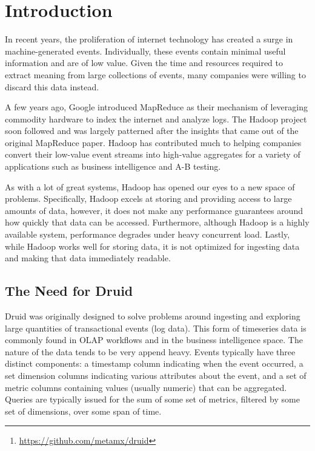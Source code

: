 \documentclass{vldb}
\begin{document}
\begin{abstract}
Druid is an open
source\footnote{\href{https://github.com/metamx/druid}{https://github.com/metamx/druid}}
data store built for exploratory analytics on large data sets.  Druid supports
fast data aggregation, low latency data ingestion, and arbitrary data
exploration. The system combines a column-oriented storage layout, a
distributed, shared-nothing architecture, and an advanced indexing structure to
return queries on billion-row tables with sub-second latencies.  Druid is
petabyte scale and is deployed in production at several technology companies.
\end{abstract}

\section{Introduction}
In recent years, the proliferation of internet technology has created a surge
in machine-generated events.  Individually, these events contain minimal useful
information and are of low value.  Given the time and resources required to
extract meaning from large collections of events, many companies were willing
to discard this data instead.  

A few years ago, Google introduced MapReduce as their mechanism of leveraging
commodity hardware to index the internet and analyze logs.  The Hadoop project
soon followed and was largely patterned after the insights that came out of the
original MapReduce paper. Hadoop has contributed much to helping companies
convert their low-value event streams into high-value aggregates for a variety
of applications such as business intelligence and A-B testing.

As with a lot of great systems, Hadoop has opened our eyes to a new space of
problems.  Specifically, Hadoop excels at storing and providing access to large
amounts of data, however, it does not make any performance guarantees around
how quickly that data can be accessed.  Furthermore, although Hadoop is a
highly available system, performance degrades under heavy concurrent load.
Lastly, while Hadoop works well for storing data, it is not optimized for
ingesting data and making that data immediately readable.

\subsection{The Need for Druid}
Druid was originally designed to solve problems around ingesting and exploring
large quantities of transactional events (log data). This form of timeseries
data is commonly found in OLAP workflows and in the business intelligence
space. The nature of the data tends to be very append heavy. Events typically
have three distinct components: a timestamp column indicating when the event
occurred, a set dimension columns indicating various attributes about the
event, and a set of metric columns containing values (usually numeric) that can
be aggregated. Queries are typically issued for the sum of some set of metrics,
filtered by some set of dimensions, over some span of time. 
\end{document}
